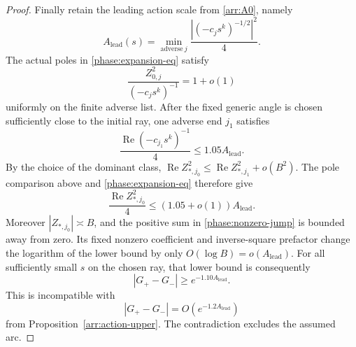 \begin{proof}
Finally retain the leading action scale from \eqref{arr:A0}, namely
\[
 A_{\mathrm{lead}}(s)=\min_{\mathrm{adverse}\ j}
       \frac{|(-c_js^k)^{-1/2}|^2}{4}.
\]
The actual poles in \eqref{phase:expansion-eq} satisfy
\[
 \frac{Z_{0,j}^2}{(-c_js^k)^{-1}}=1+o(1)
\]
uniformly on the finite adverse list.  After the fixed generic angle
is chosen sufficiently close to the initial ray, one adverse end $j_1$
satisfies
\[
 \frac{\operatorname{Re}(-c_{j_1}s^k)^{-1}}4
       \le 1.05A_{\mathrm{lead}}.
\]
By the choice of the dominant class,
$\operatorname{Re}Z_{*,j_0}^2\le\operatorname{Re}Z_{*,j_1}^2+o(B^2)$.
The pole comparison above and \eqref{phase:expansion-eq} therefore give
\[
 \frac{\operatorname{Re}Z_{*,j_0}^2}{4}
             \le(1.05+o(1))A_{\mathrm{lead}}.
\]
Moreover $|Z_{*,j_0}|\asymp B$, and the positive sum in
\eqref{phase:nonzero-jump} is bounded away from zero.  Its fixed nonzero
coefficient and inverse-square prefactor change the logarithm of the
lower bound by only $O(\log B)=o(A_{\mathrm{lead}})$.  For all
sufficiently small $s$ on the chosen ray, that lower bound is consequently
\[
       |G_+-G_-|\ge e^{-1.10A_{\mathrm{lead}}}.
\]
This is incompatible with
\[
       |G_+-G_-|=O(e^{-1.2A_{\mathrm{lead}}})
\]
from Proposition~\ref{arr:action-upper}.
The contradiction excludes the assumed arc.
\end{proof}
